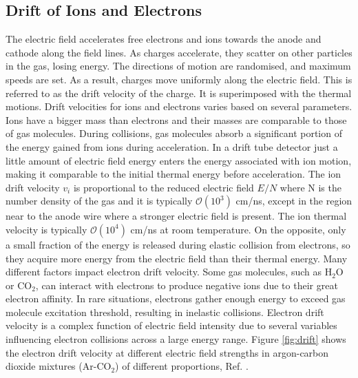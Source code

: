 \subsection{Drift of Ions and Electrons}
The electric field accelerates free electrons and ions towards the anode and cathode 
along the field lines. As charges accelerate, they scatter on other particles in the gas, 
losing energy. The directions of motion are randomised, and maximum speeds are set. As a result, 
charges move uniformly along the electric field. This is referred to as the drift velocity of the 
charge. It is superimposed with the thermal motions.
Drift velocities for ions and electrons varies based on several parameters. Ions have a bigger mass 
than electrons and their masses are comparable to those of gas molecules. During collisions, gas 
molecules absorb a significant portion of the energy gained from ions during acceleration. In a drift 
tube detector just a little amount of electric field energy enters the energy associated with ion motion, 
making it comparable to the initial thermal energy before acceleration. 
The ion drift velocity $v_i$ is proportional to the reduced electric field $E/N$ where N is the number density of the gas 
and it is typically $\mathcal{O}(10^3)$ cm/ns, except in the region near to the anode wire where a stronger 
electric field is present. The ion thermal velocity is typically $\mathcal{O}(10^4)$ cm/ns at room temperature.
On the opposite, only a small fraction of the energy is released during elastic collision from electrons, 
so they acquire more energy from the electric field than their thermal energy.
Many different factors impact electron drift velocity. Some gas molecules, such as H$_2$O or CO$_2$, 
can interact with electrons to produce negative ions due to their great electron affinity. In rare situations, 
electrons gather enough energy to exceed gas molecule excitation threshold, resulting in inelastic collisions. 
Electron drift velocity is a complex function of electric field intensity due to several variables influencing 
electron collisions across a large energy range. Figure \ref{fig:drift} shows the electron drift
velocity at different electric field strengths in argon-carbon dioxide mixtures (Ar-CO$_2$) of different
proportions, Ref. \cite{ZHAO1994485}.

